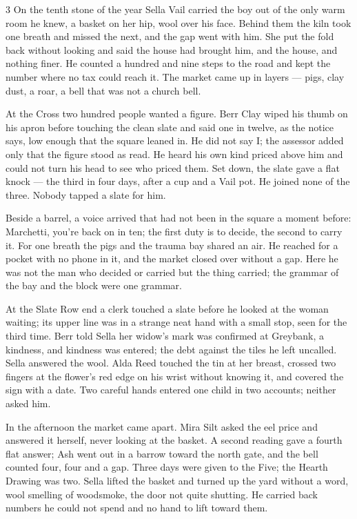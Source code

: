 \begin{CRchronicle}{3}
On the tenth stone of the year Sella Vail carried the boy out of the only warm room he knew, a basket on her hip, wool over his face. Behind them the kiln took one breath and missed the next, and the gap went with him. She put the fold back without looking and said the house had brought him, and the house, and nothing finer. He counted a hundred and nine steps to the road and kept the number where no tax could reach it. The market came up in layers --- pigs, clay dust, a roar, a bell that was not a church bell.

At the Cross two hundred people wanted a figure. Berr Clay wiped his thumb on his apron before touching the clean slate and said one in twelve, as the notice says, low enough that the square leaned in. He did not say I; the assessor added only that the figure stood as read. He heard his own kind priced above him and could not turn his head to see who priced them. Set down, the slate gave a flat knock --- the third in four days, after a cup and a Vail pot. He joined none of the three. Nobody tapped a slate for him.

Beside a barrel, a voice arrived that had not been in the square a moment before: Marchetti, you’re back on in ten; the first duty is to decide, the second to carry it. For one breath the pigs and the trauma bay shared an air. He reached for a pocket with no phone in it, and the market closed over without a gap. Here he was not the man who decided or carried but the thing carried; the grammar of the bay and the block were one grammar.

At the Slate Row end a clerk touched a slate before he looked at the woman waiting; its upper line was in a strange neat hand with a small stop, seen for the third time. Berr told Sella her widow’s mark was confirmed at Greybank, a kindness, and kindness was entered; the debt against the tiles he left uncalled. Sella answered the wool. Alda Reed touched the tin at her breast, crossed two fingers at the flower’s red edge on his wrist without knowing it, and covered the sign with a date. Two careful hands entered one child in two accounts; neither asked him.

In the afternoon the market came apart. Mira Silt asked the eel price and answered it herself, never looking at the basket. A second reading gave a fourth flat answer; Ash went out in a barrow toward the north gate, and the bell counted four, four and a gap. Three days were given to the Five; the Hearth Drawing was two. Sella lifted the basket and turned up the yard without a word, wool smelling of woodsmoke, the door not quite shutting. He carried back numbers he could not spend and no hand to lift toward them.
\end{CRchronicle}
